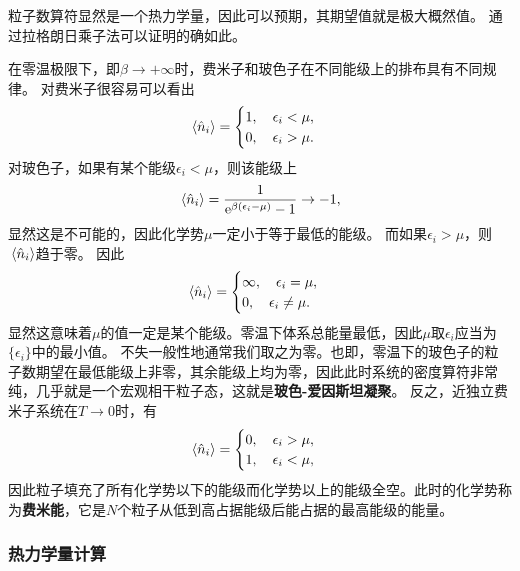 \documentclass[hyperref, UTF8, a4paper]{ctexart}
\newcommand*{\ee}{\mathrm{e}}
\begin{document}
粒子数算符显然是一个热力学量，因此可以预期，其期望值就是极大概然值。
通过拉格朗日乘子法可以证明的确如此。

在零温极限下，即$\beta \to + \infty$时，费米子和玻色子在不同能级上的排布具有不同规律。
对费米子很容易可以看出
\begin{equation}
    \expval*{\hat{n}_i} = \begin{cases}
        1, \quad \epsilon_i < \mu, \\
        0, \quad \epsilon_i > \mu.
    \end{cases}
\end{equation}
对玻色子，如果有某个能级$\epsilon_i < \mu$，则该能级上
\[
    \expval*{\hat{n}_i} = \frac{1}{\ee^{  \beta (\epsilon_i - \mu)} - 1} \to -1,
\]
显然这是不可能的，因此化学势$\mu$一定小于等于最低的能级。
而如果$\epsilon_i > \mu$，则$\expval*{\hat{n}_i}$趋于零。
因此
\[
    \expval*{\hat{n}_i} = \begin{cases}
        \infty, \quad \epsilon_i = \mu, \\
        0, \quad \epsilon_i \neq \mu.
    \end{cases}
\]
显然这意味着$\mu$的值一定是某个能级。零温下体系总能量最低，因此$\mu$取$\epsilon_i$应当为$\{\epsilon_i\}$中的最小值。
不失一般性地通常我们取之为零。也即，零温下的玻色子的粒子数期望在最低能级上非零，其余能级上均为零，因此此时系统的密度算符非常纯，几乎就是一个宏观相干粒子态，这就是\textbf{玻色-爱因斯坦凝聚}。
反之，近独立费米子系统在$T\to 0$时，有
\[
    \expval*{\hat{n}_i} = \begin{cases}
        0, \quad \epsilon_i > \mu, \\
        1, \quad \epsilon_i < \mu, 
    \end{cases}
\]
因此粒子填充了所有化学势以下的能级而化学势以上的能级全空。此时的化学势称为\textbf{费米能}，它是$N$个粒子从低到高占据能级后能占据的最高能级的能量。

\subsubsection{热力学量计算}
\end{document}
